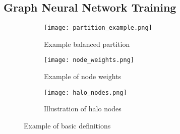 \documentclass[acmsmall,nonacm,screen,review]{acmart}
\begin{document}
\subsection{Graph Neural Network Training}

\begin{figure}[bt!]
     \centering
     \begin{subfigure}[b]{0.3\textwidth}
         \centering
         \texttt{[image: partition\_example.png]}
         \caption{Example balanced partition}
         \label{partition}
     \end{subfigure}
     \hfill
     \begin{subfigure}[b]{0.3\textwidth}
         \centering
         \texttt{[image: node\_weights.png]}
         \caption{Example of node weights}
         \label{weights}
     \end{subfigure}
     \begin{subfigure}[b]{0.3\textwidth}
        \centering
        \texttt{[image: halo\_nodes.png]}
        \caption{Illustration of halo nodes}
        \label{halo}
     \end{subfigure}
     \caption{Example of basic definitions}
     \label{definitions}
\end{figure}
\end{document}
